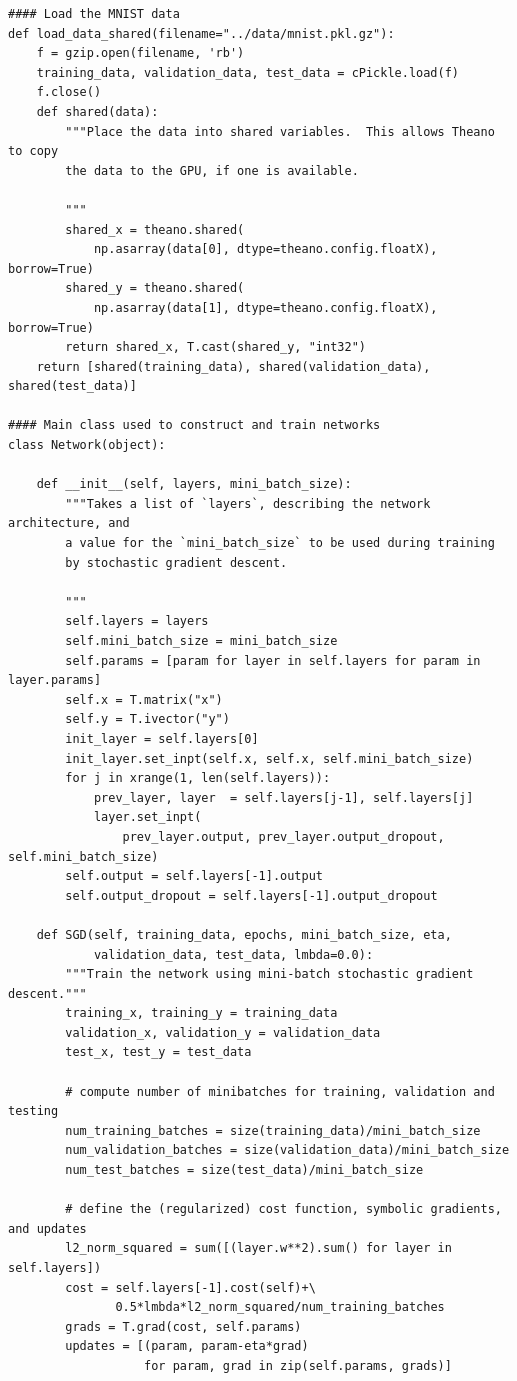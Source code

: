 \documentclass[a4paper,twoside,10pt]{book}
\begin{document}
\begin{lstlisting}
#### Load the MNIST data
def load_data_shared(filename="../data/mnist.pkl.gz"):
    f = gzip.open(filename, 'rb')
    training_data, validation_data, test_data = cPickle.load(f)
    f.close()
    def shared(data):
        """Place the data into shared variables.  This allows Theano to copy
        the data to the GPU, if one is available.

        """
        shared_x = theano.shared(
            np.asarray(data[0], dtype=theano.config.floatX), borrow=True)
        shared_y = theano.shared(
            np.asarray(data[1], dtype=theano.config.floatX), borrow=True)
        return shared_x, T.cast(shared_y, "int32")
    return [shared(training_data), shared(validation_data), shared(test_data)]

#### Main class used to construct and train networks
class Network(object):

    def __init__(self, layers, mini_batch_size):
        """Takes a list of `layers`, describing the network architecture, and
        a value for the `mini_batch_size` to be used during training
        by stochastic gradient descent.

        """
        self.layers = layers
        self.mini_batch_size = mini_batch_size
        self.params = [param for layer in self.layers for param in layer.params]
        self.x = T.matrix("x")
        self.y = T.ivector("y")
        init_layer = self.layers[0]
        init_layer.set_inpt(self.x, self.x, self.mini_batch_size)
        for j in xrange(1, len(self.layers)):
            prev_layer, layer  = self.layers[j-1], self.layers[j]
            layer.set_inpt(
                prev_layer.output, prev_layer.output_dropout, self.mini_batch_size)
        self.output = self.layers[-1].output
        self.output_dropout = self.layers[-1].output_dropout

    def SGD(self, training_data, epochs, mini_batch_size, eta,
            validation_data, test_data, lmbda=0.0):
        """Train the network using mini-batch stochastic gradient descent."""
        training_x, training_y = training_data
        validation_x, validation_y = validation_data
        test_x, test_y = test_data

        # compute number of minibatches for training, validation and testing
        num_training_batches = size(training_data)/mini_batch_size
        num_validation_batches = size(validation_data)/mini_batch_size
        num_test_batches = size(test_data)/mini_batch_size

        # define the (regularized) cost function, symbolic gradients, and updates
        l2_norm_squared = sum([(layer.w**2).sum() for layer in self.layers])
        cost = self.layers[-1].cost(self)+\
               0.5*lmbda*l2_norm_squared/num_training_batches
        grads = T.grad(cost, self.params)
        updates = [(param, param-eta*grad)
                   for param, grad in zip(self.params, grads)]


\end{lstlisting}
\end{document}
